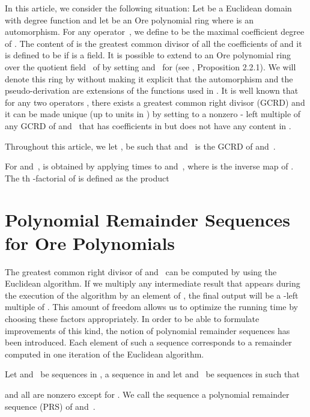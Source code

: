 \documentclass[3p,11pt,preprint]{elsarticle}
\begin{document}
In this article, we consider the following situation: Let  be a Euclidean domain with degree function  and let  be an Ore polynomial ring where  is an automorphism. For any operator~, we define  to be the maximal coefficient degree of . The content  of  is the greatest common divisor of all the coefficients of  and it is defined to be  if  is a field. It is possible to extend  to an Ore polynomial ring over the quotient field~ of  by setting  and~ for   (see \cite{zli2}, Proposition 2.2.1). We will denote this ring by  without making it explicit that the automorphism and the pseudo-derivation are extensions of the functions used in . It is well known that for any two operators , there exists a greatest common right divisor (GCRD) and it can be made unique (up to units in ) by 
setting  to a nonzero -
left multiple of any GCRD of  and~ that has coefficients in  but does not have any content in . 

Throughout this article, we let ,  be such that  and~ is the GCRD of  and~.

\begin{definition}
 For  and~,  is obtained by applying  times  to  and~, where  is the inverse map of . The th -factorial of  is defined as the product 
\end{definition}

\section{Polynomial Remainder Sequen\-ces for Ore Polynomials}
\label{prssec}

The greatest common right divisor of  and~ can be computed by using the Euclidean algorithm. If we multiply any intermediate result that appears during the execution of the  algorithm by an element of , the final output will be a -left multiple of . This amount of freedom allows us to optimize the running time by choosing these factors appropriately. In order to be able to formulate improvements of this kind, the notion of polynomial remainder sequences has been introduced. Each element of such a sequence corresponds to a remainder computed in one iteration of the Euclidean algorithm.
\begin{definition}
 Let  and~ 
be sequences in ,  a sequence in  and let  and~ be sequences in  such that
 
and all  are nonzero except for . We call the sequence  a polynomial remainder sequence (PRS) of  and~. 
\end{definition}
\end{document}
